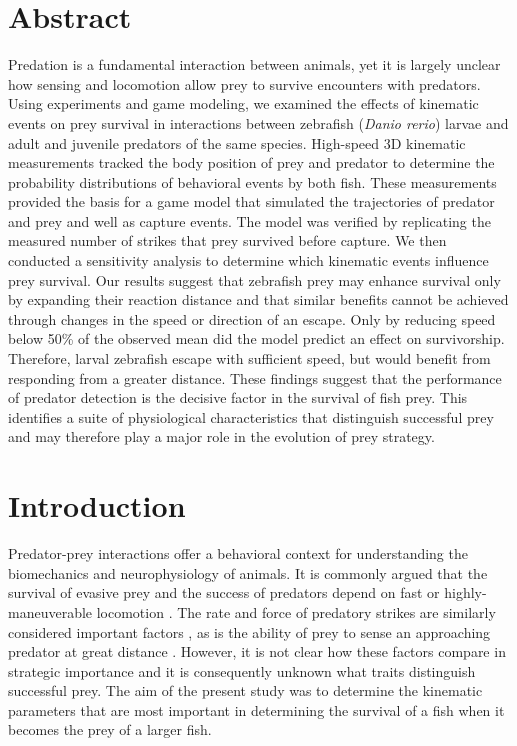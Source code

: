 \documentclass[]{rsos}%
\begin{document}
\section*{Abstract}
Predation is a fundamental interaction between animals, yet it is largely unclear how sensing and locomotion allow prey to survive encounters with predators.
Using experiments and game modeling, we examined the effects of kinematic events on prey survival in interactions between zebrafish (\textit{Danio rerio}) larvae and adult and juvenile predators of the same species.
High-speed 3D kinematic measurements tracked the body position of prey and predator to determine the probability distributions of behavioral events by both fish.
These measurements provided the basis for a game model that simulated the trajectories of predator and prey and well as capture events. 
The model was verified by replicating the measured number of strikes that prey survived before capture.
We then conducted a sensitivity analysis to determine which kinematic events influence prey survival.
Our results suggest that zebrafish prey may enhance survival only by expanding their reaction distance and that similar benefits cannot be achieved through changes in the speed or direction of an escape.
Only by reducing speed below 50\% of the observed mean did the model predict an effect on survivorship.
Therefore, larval zebrafish escape with sufficient speed, but would benefit from responding from a greater distance.
These findings suggest that the performance of predator detection is the decisive factor in the survival of fish prey.
This identifies a suite of physiological characteristics that distinguish successful prey and may therefore play a major role in the evolution of prey strategy.


\section{Introduction}

Predator-prey interactions offer a behavioral context for understanding the biomechanics and neurophysiology of animals.
It is commonly argued that the survival of evasive prey and the success of predators depend on fast or highly-maneuverable locomotion \cite{Alexander:BbR35qCj, Wilson:2013fda, Walker:2005vn, Domenici:2011tv, Howland:1974ud}.
The rate and force of predatory strikes are similarly considered important factors \cite{deVries:2012tc, Holzman:2009uu}
, as is the ability of prey to sense an approaching predator at great distance \cite{Dill:1972wh, Gabbiani:1999wz}.
However, it is not clear how these factors compare in strategic importance and it is consequently unknown what traits distinguish successful prey. 
The aim of the present study was to determine the kinematic parameters that are most important in determining the survival of a fish when it becomes the prey of a larger fish.
\end{document}
